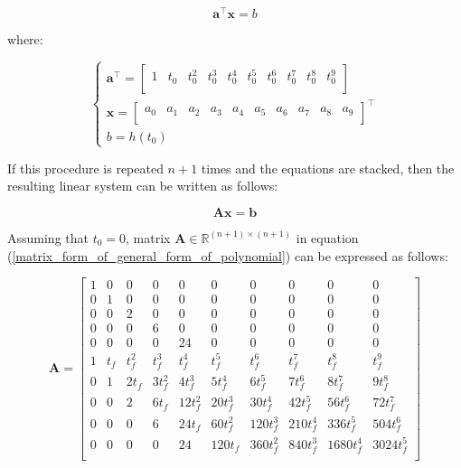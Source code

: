 \documentclass{thesisreport}
\begin{document}
\begin{equation}\label{abbreviated_general_form_of_polynomial}
	\bm{a}^{\intercal} \bm{x} = b 
\end{equation}

where: 

 \begin{equation}\label{vectors_in_avvreviated_general_form_of_polynomial}
 	\begin{cases}
 		\bm{a}^{\intercal} = \begin{bmatrix}
 		1 & t_0 & t_0^2 &  t_0^3 & t_0^4 & t_0^5 & t_0^6 & t_0^7 & t_0^8 & t_0^9 \\
 		\end{bmatrix} \\
 		\bm{x} = \begin{bmatrix}
 		a_0 & a_1 & a_2 &  a_3 & a_4 & a_5 & a_6 & a_7 & a_8 & a_9 \\
 		\end{bmatrix}^{\intercal} \\
 		b = h(t_0) 
 	\end{cases}
 \end{equation}

If this procedure is repeated $n+1$ times and the equations are stacked, then the resulting linear system can be written as follows:

	\begin{equation}\label{matrix_form_of_general_form_of_polynomial}
		\bm{A} \bm{x} = \bm{b}
	\end{equation}
	
Assuming that $t_0=0$, matrix $\bm{A}  \in \mathbb{R}^{(n+1)\times(n+1)}$ in equation (\ref{matrix_form_of_general_form_of_polynomial}) can be expressed as follows:

\begin{equation}\label{matrix_A_in_general_matrix_form_of_polynomial}
        \bm{A} = \begin{bmatrix}
            1 & 0 & 0 & 0 & 0 & 0 & 0 & 0 & 0 & 0 \\ 
            0 & 1 & 0 & 0 & 0 & 0 & 0 & 0 & 0 & 0 \\
            0 & 0 & 2 & 0 & 0 & 0 & 0 & 0 & 0 & 0 \\
            0 & 0 & 0 & 6 & 0 & 0 & 0 & 0 & 0 & 0 \\
            0 & 0 & 0 & 0 & 24 & 0 & 0 & 0 & 0 & 0 \\
            1 & t_f &  t_f^2 &  t_f^3 &    t_f^4 &    t_f^5 &    t_f^6 &    t_f^7 &     t_f^8 &     t_f^9 \\ 
            0 & 1   & 2t_f   & 3t_f^2 &   4t_f^3 &   5t_f^4 &   6t_f^5 &  7 t_f^6 &    8t_f^7 &    9t_f^8 \\ 
            0 & 0   & 2      & 6t_f   &  12t_f^2 &  20t_f^3 &  30t_f^4 &  42t_f^5 &   56t_f^6 &   72t_f^7 \\ 
            0 & 0   & 0      & 6      &  24t_f   &  60t_f^2 & 120t_f^3 & 210t_f^4 &  336t_f^5 &  504t_f^6 \\
            0 & 0   & 0      & 0      &  24      & 120t_f   & 360t_f^2 & 840t_f^3 & 1680t_f^4 & 3024t_f^5 \\
        \end{bmatrix}
    \end{equation} 
\end{document}
